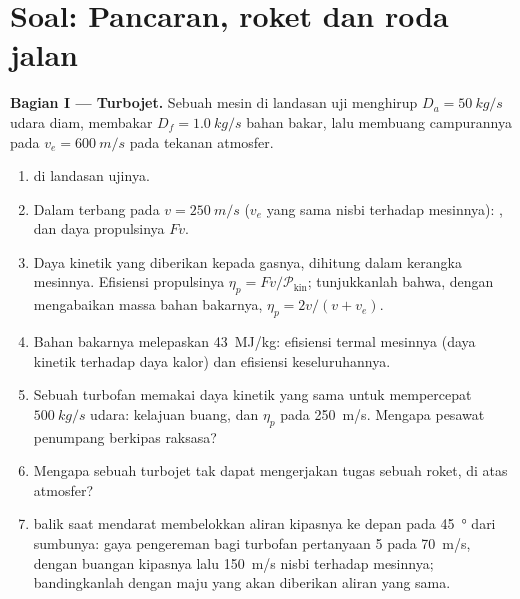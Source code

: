 \section{Soal: Pancaran, roket dan roda jalan}

\begin{problem}
\label{pb:b2:flow-balances:1}

\medskip
\noindent\textbf{Bagian I --- Turbojet.}
Sebuah mesin di landasan uji menghirup $D_a = \qty{50}{kg/s}$ udara diam,
membakar $D_f = \qty{1.0}{kg/s}$ bahan bakar, lalu membuang campurannya pada $v_e =
\qty{600}{m/s}$ pada tekanan atmosfer.
\begin{enumerate}
  \item {} di landasan ujinya.
  \item Dalam terbang pada $v = \qty{250}{m/s}$ ($v_e$ yang sama nisbi terhadap
        mesinnya): , dan daya propulsinya $Fv$.
  \item Daya kinetik yang diberikan kepada gasnya, dihitung dalam kerangka mesinnya.
        Efisiensi propulsinya $\eta_p = Fv/\mathcal P_{\text{kin}}$; tunjukkanlah
        bahwa, dengan mengabaikan massa bahan bakarnya, $\eta_p = 2v/(v + v_e)$.
  \item Bahan bakarnya melepaskan \qty{43}{MJ/kg}: efisiensi termal
        mesinnya (daya kinetik terhadap daya kalor) dan efisiensi keseluruhannya.
  \item Sebuah turbofan memakai daya kinetik yang sama untuk mempercepat
        $\qty{500}{kg/s}$ udara: kelajuan buang,  dan $\eta_p$ pada
        \qty{250}{m/s}. Mengapa pesawat penumpang berkipas raksasa?
  \item Mengapa sebuah turbojet tak dapat mengerjakan tugas sebuah roket, di atas
        atmosfer?
  \item {} balik saat mendarat membelokkan aliran kipasnya ke depan pada
        \qty{45}{\degree} dari sumbunya: gaya pengereman bagi turbofan
        pertanyaan 5 pada \qty{70}{m/s}, dengan buangan kipasnya lalu
        \qty{150}{m/s} nisbi terhadap mesinnya; bandingkanlah dengan  maju
        yang akan diberikan aliran yang sama.
\end{enumerate}


\end{problem}
